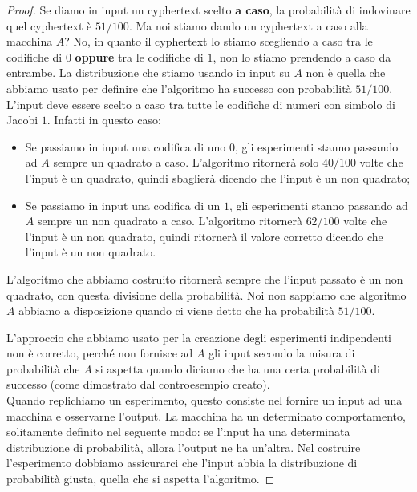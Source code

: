 \begin{proof}
\noindent Se diamo in input un cyphertext scelto \textbf{a caso}, la probabilità di indovinare quel cyphertext è $51/100$. Ma noi stiamo dando un cyphertext a caso alla macchina $A$? No, in quanto il cyphertext lo stiamo scegliendo a caso tra le codifiche di $0$ \textbf{oppure} tra le codifiche di $1$, non lo stiamo prendendo a caso da entrambe. La distribuzione che stiamo usando in input su $A$ non è quella che abbiamo usato per definire che l'algoritmo ha successo con probabilità $51/100$. L'input deve essere scelto a caso tra tutte le codifiche di numeri con simbolo di Jacobi $1$. Infatti in questo caso:
\begin{itemize}
    \item Se passiamo in input una codifica di uno $0$, gli esperimenti stanno passando ad $A$ sempre un quadrato a caso. L'algoritmo ritornerà solo $40/100$ volte che l'input è un quadrato, quindi sbaglierà dicendo che l'input è un non quadrato;
    \item Se passiamo in input una codifica di un $1$, gli esperimenti stanno passando ad $A$ sempre un non quadrato a caso. L'algoritmo ritornerà $62/100$ volte che l'input è un non quadrato, quindi ritornerà il valore corretto dicendo che l'input è un non quadrato.
\end{itemize}

\noindent L'algoritmo che abbiamo costruito ritornerà sempre che l'input passato è un non quadrato, con questa divisione della probabilità. Noi non sappiamo che algoritmo $A$ abbiamo a disposizione quando ci viene detto che ha probabilità $51/100$. 

L'approccio che abbiamo usato per la creazione degli esperimenti indipendenti non è corretto, perché non fornisce ad $A$ gli input secondo la misura di probabilità che $A$ si aspetta quando diciamo che ha una certa probabilità di successo (come dimostrato dal controesempio creato). \\

\noindent Quando replichiamo un esperimento, questo consiste nel fornire un input ad una macchina e osservarne l'output. La macchina ha un determinato comportamento, solitamente definito nel seguente modo: se l'input ha una determinata distribuzione di probabilità, allora l'output ne ha un'altra. Nel costruire l'esperimento dobbiamo assicurarci che l'input abbia la distribuzione di probabilità giusta, quella che si aspetta l'algoritmo.


\end{proof}
